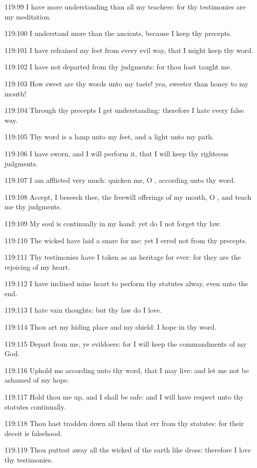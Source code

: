 119:99 I have more understanding than all my teachers: for thy testimonies are my meditation.

119:100 I understand more than the ancients, because I keep thy precepts.

119:101 I have refrained my feet from every evil way, that I might keep thy word.

119:102 I have not departed from thy judgments: for thou hast taught me.

119:103 How sweet are thy words unto my taste! yea, sweeter than honey to my mouth!

119:104 Through thy precepts I get understanding: therefore I hate every false way.

119:105 Thy word is a lamp unto my feet, and a light unto my path.

119:106 I have sworn, and I will perform it, that I will keep thy righteous judgments.

119:107 I am afflicted very much: quicken me, O \LORD, according unto thy word.

119:108 Accept, I beseech thee, the freewill offerings of my mouth, O \LORD, and teach me thy judgments.

119:109 My soul is continually in my hand: yet do I not forget thy law.

119:110 The wicked have laid a snare for me: yet I erred not from thy precepts.

119:111 Thy testimonies have I taken as an heritage for ever: for they are the rejoicing of my heart.

119:112 I have inclined mine heart to perform thy statutes alway, even unto the end.

119:113 I hate vain thoughts: but thy law do I love.

119:114 Thou art my hiding place and my shield: I hope in thy word.

119:115 Depart from me, ye evildoers: for I will keep the commandments of my God.

119:116 Uphold me according unto thy word, that I may live: and let me not be ashamed of my hope.

119:117 Hold thou me up, and I shall be safe: and I will have respect unto thy statutes continually.

119:118 Thou hast trodden down all them that err from thy statutes: for their deceit is falsehood.

119:119 Thou puttest away all the wicked of the earth like dross: therefore I love thy testimonies.

